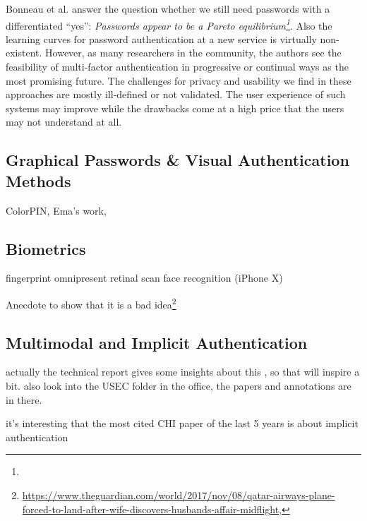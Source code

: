 Bonneau et al. answer the question whether we still need passwords with a differentiated ``yes'': \textit{Passwords appear to be a Pareto equilibrium\footnote{}}. Also the learning curves for password authentication at a new service is virtually non-existent. However, as many researchers in the community, the authors see the feasibility of multi-factor authentication in progressive or continual ways as the most promising future. The challenges for privacy and usability we find in these approaches are mostly ill-defined or not validated. The user experience of such systems may improve while the drawbacks come at a high price that the users may not understand at all. 

	\subsection{Graphical Passwords \& Visual Authentication Methods}
ColorPIN, Ema's work, \cite{Renaud2009VisualSnakeOil} 

	\subsection{Biometrics}
	
	\cite{Jakobsson2014HowToWearYourPW,DeLuca2012TouchMeOnce,Peisert2013PriciplesAuthentication,Rybnicek2014RoadmapContinuousAuth}
	

	fingerprint omnipresent 
	retinal scan
	face recognition (iPhone X)
	
	
	Anecdote to show that it is a bad idea\footnote{\url{https://www.theguardian.com/world/2017/nov/08/qatar-airways-plane-forced-to-land-after-wife-discovers-husbands-affair-midflight}, }
	
	\subsection{Multimodal and Implicit Authentication}
	
	actually the technical report gives some insights about this \cite{Stockinger2011ImplicitAuthentication}, so that will inspire a bit.
	also look into the USEC folder in the office, the papers and annotations are in there.
	
		it's interesting that the most cited CHI paper of the last 5 years is about implicit authentication \cite{DeLuca2012TouchMeOnce}
	
